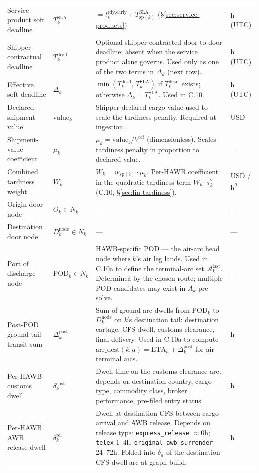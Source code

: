 \documentclass[11pt,a4paper]{article}
\theoremstyle{definition}
\begin{document}
\begin{table}[H]
\begin{tabular}{p{3.5cm}p{2.2cm}p{6.5cm}p{1.5cm}}
Service-product soft deadline & $T_k^{\text{SLA}}$ & $= t_k^{\text{rdy,early}} + T^{\text{SLA}}_{\text{sp}(k)}$ (\S\ref{sec:service-products}) & h (UTC) \\
Shipper-contractual deadline & $T_k^{\text{dead}}$ & Optional shipper-contracted door-to-door deadline; absent when the service product alone governs. Used only as one of the two terms in $\Delta_k$ (next row). & h (UTC) \\
Effective soft deadline & $\Delta_k$ & $\min(T_k^{\text{dead}},\, T_k^{\text{SLA}})$ if $T_k^{\text{dead}}$ exists; otherwise $\Delta_k = T_k^{\text{SLA}}$. Used in C.10. & h (UTC) \\
Declared shipment value & $\text{value}_k$ & Shipper-declared cargo value used to scale the tardiness penalty. Required at ingestion. & USD \\
Shipment-value coefficient & $\mu_k$ & $\mu_k = \text{value}_k / V^{\text{ref}}$ (dimensionless). Scales tardiness penalty in proportion to declared value. & --- \\
Combined tardiness weight & $W_k$ & $W_k = w_{\text{sp}(k)} \cdot \mu_k$. Per-HAWB coefficient in the quadratic tardiness term $W_k \cdot \tau_k^2$ (C.10, \S\ref{sec:lin-tardiness}). & USD / h\textsuperscript{2} \\
Origin door node & $O_k \in N_k$ & --- & --- \\
Destination door node & $D_k^{\text{node}} \in N_k$ & --- & --- \\
Port of discharge node & $\text{POD}_k \in N_k$ & HAWB-specific POD --- the air-arc head node where $k$'s air leg lands. Used in C.10a to define the terminal-arc set $\mathcal{A}^{\text{last}}_k$. Determined by the chosen route; multiple POD candidates may exist in $A_k$ pre-solve. & --- \\
Post-POD ground tail transit sum & $\Delta^{\text{post}}_k$ & Sum of ground-arc dwells from $\text{POD}_k$ to $D_k^{\text{node}}$ on $k$'s destination tail: destination cartage, CFS dwell, customs clearance, final delivery. Used in C.10a to compute $\text{arr\_dest}(k, a) = \text{ETA}_a + \Delta^{\text{post}}_k$ for air terminal arcs. & h \\
Per-HAWB customs dwell & $\delta^{\text{cust}}_k$ & Dwell time on the customs-clearance arc; depends on destination country, cargo type, commodity class, broker performance, pre-filed entry status & h \\
Per-HAWB AWB release dwell & $\delta^{\text{rel}}_k$ & Dwell at destination CFS between cargo arrival and AWB release. Depends on release type: \texttt{express\_release} $\approx 0$h; \texttt{telex} 1--4h; \texttt{original\_awb\_surrender} 24--72h. Folded into $\delta_a$ of the destination CFS dwell arc at graph build. & h \\

\end{tabular}
\end{table}
\end{document}
